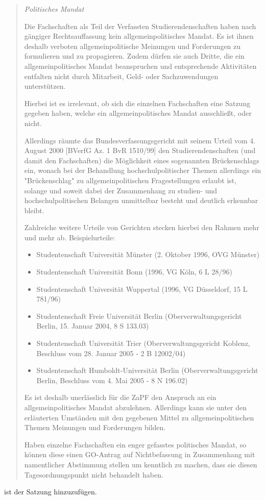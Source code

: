 \documentclass[draft,10pt,oneside]{scrartcl}
\begin{document}
\begin{quote}
\emph{Politisches Mandat}

Die Fachschaften als Teil der Verfassten Studierendenschaften haben nach
gängiger Rechtsauffassung kein allgemeinpolitisches Mandat. Es ist ihnen deshalb
verboten allgemeinpolitische Meinungen und Forderungen zu formulieren und zu
propagieren. Zudem dürfen sie auch Dritte, die ein allgemeinpolitisches Mandat
beanspruchen und entsprechende Aktivitäten entfalten nicht durch Mitarbeit,
Geld- oder Sachzuwendungen unterstützen.

Hierbei ist es irrelevant, ob sich die einzelnen Fachschaften eine Satzung
gegeben haben, welche ein allgemeinpolitisches Mandat ausschließt, oder nicht.

Allerdings räumte das Bundesverfassungsgericht mit seinem Urteil vom 4. August
2000 [BVerfG Az. 1 BvR 1510/99] den Studierendenschaften (und damit den
Fachschaften) die Möglichkeit eines sogenannten Brückenschlags ein, wonach bei
der Behandlung hochschulpolitischer Themen allerdings ein "Brückenschlag" zu
allgemeinpolitischen Fragestellungen erlaubt ist, solange und soweit dabei der
Zusammenhang zu studien- und hochschulpolitischen Belangen unmittelbar besteht
und deutlich erkennbar bleibt.

Zahlreiche weitere Urteile von Gerichten stecken hierbei den Rahmen mehr und
mehr ab. Beispielurteile:

\begin{itemize}
\item Studentenschaft Universität Münster (2. Oktober 1996, OVG Münster)
\item Studentenschaft Universität Bonn (1996, VG Köln, 6 L 28/96)
\item Studentenschaft Universität Wuppertal (1996, VG Düsseldorf, 15 L 781/96)
\item Studentenschaft Freie Universität Berlin (Oberverwaltungsgericht
  Berlin, 15. Januar 2004, 8 S 133.03)
\item Studentenschaft Universität Trier (Oberverwaltungsgericht Koblenz,
  Beschluss vom 28. Januar 2005 - 2 B 12002/04)
\item Studentenschaft Humboldt-Universität Berlin (Oberverwaltungsgericht
  Berlin, Beschluss vom 4. Mai 2005 - 8 N 196.02)
\end{itemize}

Es ist deshalb unerlässlich für die ZaPF den Anspruch an ein
allgemeinpolitisches Mandat abzulehnen. Allerdings kann sie unter den
erläuterten Umständen mit den gegebenen Mittel zu allgemeinpolitischen Themen
Meinungen und Forderungen bilden.

Haben einzelne Fachschaften ein enger gefasstes politisches Mandat, so können
diese einen GO-Antrag auf Nichtbefassung in Zusammenhang mit namentlicher
Abstimmung stellen um kenntlich zu machen, dass sie diesen Tagesordnungspunkt
nicht behandelt haben.
\end{quote}
ist der Satzung hinzuzufügen.
\end{document}
